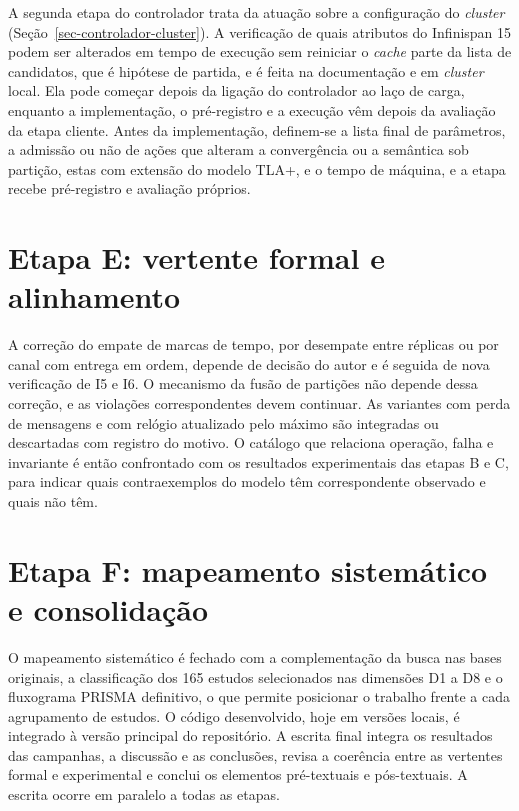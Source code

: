 A segunda etapa do controlador trata da atuação sobre a configuração do \emph{cluster} (Seção~\ref{sec-controlador-cluster}). A verificação de quais atributos do Infinispan 15 podem ser alterados em tempo de execução sem reiniciar o \emph{cache} parte da lista de candidatos, que é hipótese de partida, e é feita na documentação e em \emph{cluster} local. Ela pode começar depois da ligação do controlador ao laço de carga, enquanto a implementação, o pré-registro e a execução vêm depois da avaliação da etapa cliente. Antes da implementação, definem-se a lista final de parâmetros, a admissão ou não de ações que alteram a convergência ou a semântica sob partição, estas com extensão do modelo TLA+, e o tempo de máquina, e a etapa recebe pré-registro e avaliação próprios.

\section*{Etapa E: vertente formal e alinhamento}
\label{ap-tcc2-etapa-e}

A correção do empate de marcas de tempo, por desempate entre réplicas ou por canal com entrega em ordem, depende de decisão do autor e é seguida de nova verificação de I5 e I6. O mecanismo da fusão de partições não depende dessa correção, e as violações correspondentes devem continuar. As variantes com perda de mensagens e com relógio atualizado pelo máximo são integradas ou descartadas com registro do motivo. O catálogo que relaciona operação, falha e invariante é então confrontado com os resultados experimentais das etapas B e C, para indicar quais contraexemplos do modelo têm correspondente observado e quais não têm.

\section*{Etapa F: mapeamento sistemático e consolidação}
\label{ap-tcc2-etapa-f}

O mapeamento sistemático é fechado com a complementação da busca nas bases originais, a classificação dos 165 estudos selecionados nas dimensões D1 a D8 e o fluxograma PRISMA definitivo, o que permite posicionar o trabalho frente a cada agrupamento de estudos. O código desenvolvido, hoje em versões locais, é integrado à versão principal do repositório. A escrita final integra os resultados das campanhas, a discussão e as conclusões, revisa a coerência entre as vertentes formal e experimental e conclui os elementos pré-textuais e pós-textuais. A escrita ocorre em paralelo a todas as etapas.
